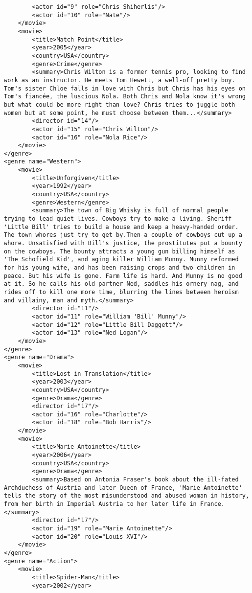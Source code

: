 \documentclass[a4paper, notitlepage]{article}
\begin{document}
\begin{enumerate}
\begin{lstlisting}
		<actor id="9" role="Chris Shiherlis"/>
		<actor id="10" role="Nate"/>
	</movie>
	<movie>
		<title>Match Point</title>
		<year>2005</year>
		<country>USA</country>
		<genre>Crime</genre>
		<summary>Chris Wilton is a former tennis pro, looking to find work as an instructor. He meets Tom Hewett, a well-off pretty boy. Tom's sister Chloe falls in love with Chris but Chris has his eyes on Tom's fiancée, the luscious Nola. Both Chris and Nola know it's wrong but what could be more right than love? Chris tries to juggle both women but at some point, he must choose between them...</summary>
		<director id="14"/>
		<actor id="15" role="Chris Wilton"/>
		<actor id="16" role="Nola Rice"/>
	</movie>
</genre>
<genre name="Western">
	<movie>
		<title>Unforgiven</title>
		<year>1992</year>
		<country>USA</country>
		<genre>Western</genre>
		<summary>The town of Big Whisky is full of normal people trying to lead quiet lives. Cowboys try to make a living. Sheriff 'Little Bill' tries to build a house and keep a heavy-handed order. The town whores just try to get by.Then a couple of cowboys cut up a whore. Unsatisfied with Bill's justice, the prostitutes put a bounty on the cowboys. The bounty attracts a young gun billing himself as 'The Schofield Kid', and aging killer William Munny. Munny reformed for his young wife, and has been raising crops and two children in peace. But his wife is gone. Farm life is hard. And Munny is no good at it. So he calls his old partner Ned, saddles his ornery nag, and rides off to kill one more time, blurring the lines between heroism and villainy, man and myth.</summary>
		<director id="11"/>
		<actor id="11" role="William 'Bill' Munny"/>
		<actor id="12" role="Little Bill Daggett"/>
		<actor id="13" role="Ned Logan"/>
	</movie>
</genre>
<genre name="Drama">
	<movie>
		<title>Lost in Translation</title>
		<year>2003</year>
		<country>USA</country>
		<genre>Drama</genre>
		<director id="17"/>
		<actor id="16" role="Charlotte"/>
		<actor id="18" role="Bob Harris"/>
	</movie>
	<movie>
		<title>Marie Antoinette</title>
		<year>2006</year>
		<country>USA</country>
		<genre>Drama</genre>
		<summary>Based on Antonia Fraser's book about the ill-fated Archduchess of Austria and later Queen of France, 'Marie Antoinette' tells the story of the most misunderstood and abused woman in history, from her birth in Imperial Austria to her later life in France. </summary>
		<director id="17"/>
		<actor id="19" role="Marie Antoinette"/>
		<actor id="20" role="Louis XVI"/>
	</movie>
</genre>
<genre name="Action">
	<movie>
		<title>Spider-Man</title>
		<year>2002</year>

\end{lstlisting}
\end{enumerate}
\end{document}
